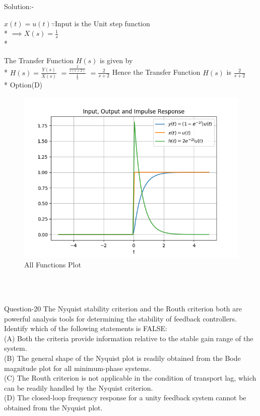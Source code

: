 \documentclass[journal,12pt,twocolumn]{IEEEtran}
\begin{document}
\begin{frame}{Solution:- }
\begin{frame}{}
\begin{frame}{}
\vskip 1cm
$x(t) = u(t)  \because  $Input is the Unit step function\\*
\vskip 0.3cm
$\implies X(s) = \frac{1}{s}$\\*

\end{frame}

\begin{frame}{}

The Transfer Function $H(s)$ is given by\\*
\vskip 0.3cm
$H(s) = \frac{Y(s)}{X(s)}$
$= \frac{\frac{2}{s(s+2)}}{\frac{1}{s}}$
$= \frac{2}{s+2}$
\vskip 1cm
Hence the Transfer Function $H(s)$ is $\frac{2}{s+2}$\\*
Option(D)
\end{frame}

\begin{frame}{}

\begin{figure}
  \includegraphics[width=\linewidth]{./figs/Plot_1.png}
  \caption{All Functions Plot}
\end{figure}
\end{frame}
\\\\
\begin{frame}{Question-20 }
The Nyquist stability criterion and the Routh criterion both are powerful analysis tools for
determining the stability of feedback controllers. Identify which of the following statements
is FALSE:
\\
(A) Both the criteria provide information relative to the stable gain range of the system.
\\(B) The general shape of the Nyquist plot is readily obtained from the Bode magnitude plot
for all minimum-phase systems.
\\(C) The Routh criterion is not applicable in the condition of transport lag, which can be
readily handled by the Nyquist criterion.
\\ (D) The closed-loop frequency response for a unity feedback system cannot be obtained
from the Nyquist plot. 


\end{frame}
\end{frame}
\end{frame}
\end{document}
